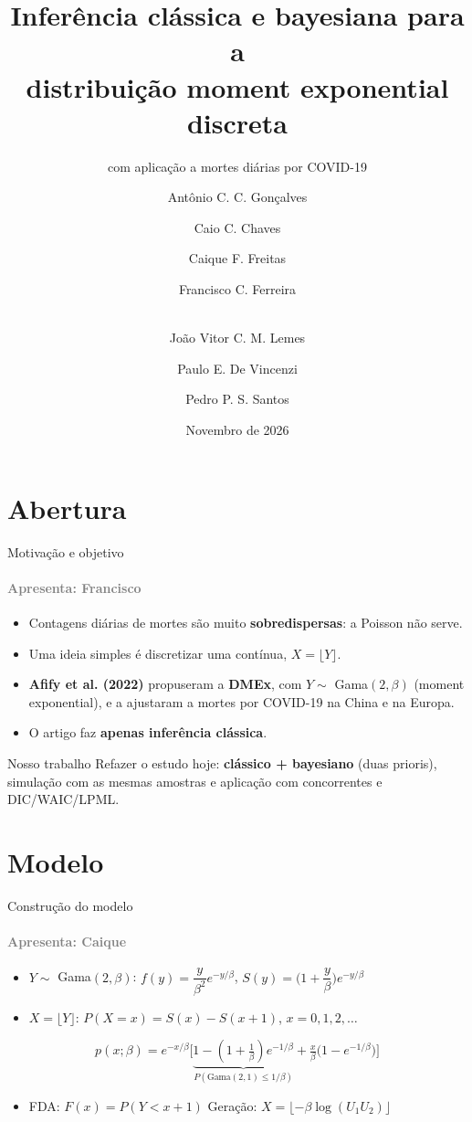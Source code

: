 \documentclass[10pt,aspectratio=169]{beamer}
\title[DMEx: clássico e bayesiano]{Inferência clássica e bayesiana para a\\distribuição moment exponential discreta}
\subtitle{com aplicação a mortes diárias por COVID-19}
\author[SME0809]{Antônio C. C. Gonçalves \and Caio C. Chaves \and Caique F. Freitas \and Francisco C. Ferreira \and\\
João Vitor C. M. Lemes \and Paulo E. De Vincenzi \and Pedro P. S. Santos}
\institute[ICMC-USP]{SME0809 Inferência Bayesiana -- Prof. Adriano K. Suzuki\\ICMC-USP}
\date{Novembro de 2026}
\newcommand{\por}[1]{\framesubtitle{\textcolor{gray}{Apresenta: #1}}}
\begin{document}
\section{Abertura}
\begin{frame}
\titlepage
\end{frame}

\begin{frame}{Motivação e objetivo}
\por{Francisco}
\begin{itemize}
\item Contagens diárias de mortes são muito \textbf{sobredispersas}: a Poisson não serve.
\item Uma ideia simples é discretizar uma contínua, $X=\lfloor Y\rfloor$.
\item \textbf{Afify et al. (2022)} propuseram a \textbf{DMEx}, com $Y\sim$ Gama$(2,\beta)$ (moment exponential), e a ajustaram a mortes por COVID-19 na China e na Europa.
\item O artigo faz \textbf{apenas inferência clássica}.
\end{itemize}
\vspace{0.3cm}
\begin{block}{Nosso trabalho}
Refazer o estudo hoje: \textbf{clássico + bayesiano} (duas prioris), simulação com as mesmas amostras e aplicação com concorrentes e DIC/WAIC/LPML.
\end{block}
\end{frame}

\section{Modelo}
\begin{frame}{Construção do modelo}
\por{Caique}
\begin{itemize}
\item $Y\sim$ Gama$(2,\beta)$: \quad $f(y)=\dfrac{y}{\beta^2}e^{-y/\beta}$, \quad $S(y)=\Big(1+\dfrac y\beta\Big)e^{-y/\beta}$
\item $X=\lfloor Y\rfloor$: \quad $P(X=x)=S(x)-S(x+1)$, \quad $x=0,1,2,\dots$
\end{itemize}
\[
p(x;\beta)=e^{-x/\beta}\Big[\underbrace{1-(1+\tfrac1\beta)e^{-1/\beta}}_{P(\text{Gama}(2,1)\le1/\beta)}+\tfrac{x}{\beta}\big(1-e^{-1/\beta}\big)\Big]
\]
\begin{itemize}
\item FDA: $F(x)=P(Y<x+1)$ \qquad Geração: $X=\lfloor-\beta\log(U_1U_2)\rfloor$
\end{itemize}
\end{frame}
\end{document}

